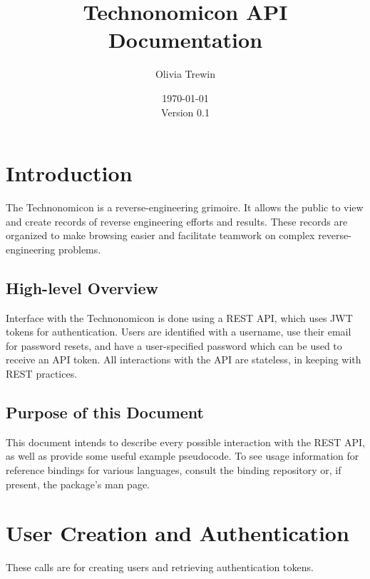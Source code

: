 \documentclass[12pt]{article}
\title{Technonomicon API Documentation}
\author{Olivia Trewin}
\date{\today\\ \normalsize Version 0.1}
\begin{document}
    \maketitle

    \section{Introduction}
        The Technonomicon is a reverse-engineering grimoire.
        It allows the public to view and create records of reverse engineering efforts and results.
        These records are organized to make browsing easier and facilitate teamwork on complex reverse-engineering problems.

        \subsection{High-level Overview}
            Interface with the Technonomicon is done using a REST API, which uses JWT tokens for authentication.
            Users are identified with a username, use their email for password resets, and have a user-specified password which can be used to receive an API token.
            All interactions with the API are stateless, in keeping with REST practices.
        
        \subsection{Purpose of this Document}
            This document intends to describe every possible interaction with the REST API, as well as provide some useful example pseudocode.
            To see usage information for reference bindings for various languages, consult the binding repository or, if present, the package's man page.

    \section{User Creation and Authentication}
        These calls are for creating users and retrieving authentication tokens.
\end{document}
